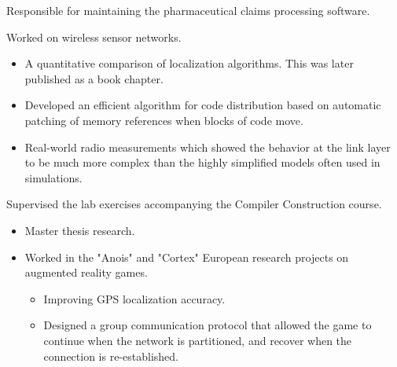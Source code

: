 \documentclass[10pt,a4paper]{../altacv}
\begin{document}

	\medskip

	Responsible for maintaining the pharmaceutical claims processing software.

	\medskip
	
	

	\bigskip\bigskip{}
	
	Worked on wireless sensor networks.
	
	\medskip
	
	\begin{itemize}
		\item\small A quantitative comparison of localization algorithms. This was later published as a book chapter.
		\smallskip
		\item\small Developed an efficient algorithm for code distribution based on automatic patching of memory references when blocks of code move.
		\smallskip
		\item\small Real-world radio measurements which showed the behavior at the link layer to be much more complex than the highly simplified models often used in simulations.
	\end{itemize}
	
	\medskip
	
	Supervised the lab exercises accompanying the Compiler Construction course.
	
	\medskip
	
	
	
	\bigskip\bigskip{}
	
	\begin{itemize}
		\item Master thesis research.
		\smallskip
		\item Worked in the "Anois" and "Cortex" European research projects on augmented reality games.
		\begin{itemize}
			\item[-] Improving GPS localization accuracy.
			\item[-] Designed a group communication protocol that allowed the game to continue when the network is partitioned, and recover when the connection is re-established.
		\end{itemize}
	\end{itemize}
	
\end{document}
